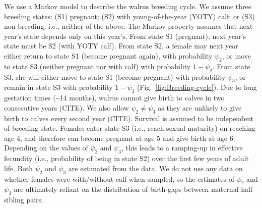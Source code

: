 We use a Markov model to describe the walrus breeding cycle. We assume
three breeding states: (S1) pregnant; (S2) with young-of-the-year
(YOTY) calf; or (S3) non-breeding, i.e., neither of the above. The
Markov property assumes that next year's state depends only on this
year's. From state S1 (pregnant), next year's state must be S2 (with
YOTY calf). From state S2, a female may next year either return to
state S1 (become pregnant again), with probability $\psi_{2}$, or
move to state S3 (neither pregnant nor with calf) with probability
$1-\psi_{2}$. From state S3, she will either move to state S1 (become
pregnant) with probability $\psi_{3}$, or remain in state S3 with
probability $1-\psi_{3}$ (Fig.~\ref{fig:Breeding-cycle}). Due to
long gestation times (\textasciitilde 14 months), walrus cannot give
birth to calves in two consecutive years (CITE). We also allow $\psi_{2}\neq\psi_{3}$
as they are unlikely to give birth to calves every second year (CITE).
Survival is assumed to be independent of breeding state. Females enter
state S3 (i.e., reach sexual maturity) on reaching age 4, and therefore
can become pregnant at age 5 and give birth at age 6. Depending on
the values of $\psi_{2}$ and $\psi_{3}$, this leads to a ramping-up
in effective fecundity (i.e., probability of being in state S2) over
the first few years of adult life. Both $\psi_{2}$ and $\psi_{3}$
are estimated from the data. We do not use any data on whether females
were with/without calf when sampled, so the estimates of $\psi_{2}$
and $\psi_{3}$ are ultimately reliant on the distribution of birth-gaps
between maternal half-sibling pairs.

